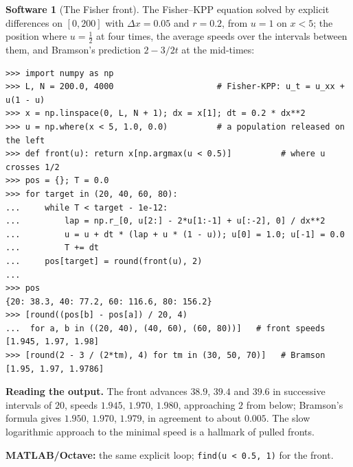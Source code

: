 \documentclass[11pt,a4paper]{article}
\numberwithin{equation}{section}
\theoremstyle{definition}
\newtheorem{software}[thm]{Software}
\begin{document}
\begin{software}[The Fisher front]
\label{sw:fisher}
The Fisher--KPP equation solved by explicit differences on $[0, 200]$ with $\Delta x = 0.05$ and $r = 0.2$, from $u = 1$ on $x < 5$; the position where $u = \frac12$ at four times, the average speeds over the intervals between them, and Bramson's prediction $2 - 3/2t$ at the mid-times:
{\small\begin{verbatim}
>>> import numpy as np
>>> L, N = 200.0, 4000                     # Fisher-KPP: u_t = u_xx + u(1 - u)
>>> x = np.linspace(0, L, N + 1); dx = x[1]; dt = 0.2 * dx**2
>>> u = np.where(x < 5, 1.0, 0.0)          # a population released on the left
>>> def front(u): return x[np.argmax(u < 0.5)]          # where u crosses 1/2
>>> pos = {}; T = 0.0
>>> for target in (20, 40, 60, 80):
...     while T < target - 1e-12:
...         lap = np.r_[0, u[2:] - 2*u[1:-1] + u[:-2], 0] / dx**2
...         u = u + dt * (lap + u * (1 - u)); u[0] = 1.0; u[-1] = 0.0
...         T += dt
...     pos[target] = round(front(u), 2)
...
>>> pos
{20: 38.3, 40: 77.2, 60: 116.6, 80: 156.2}
>>> [round((pos[b] - pos[a]) / 20, 4)
...  for a, b in ((20, 40), (40, 60), (60, 80))]   # front speeds
[1.945, 1.97, 1.98]
>>> [round(2 - 3 / (2*tm), 4) for tm in (30, 50, 70)]   # Bramson
[1.95, 1.97, 1.9786]
\end{verbatim}}
\textbf{Reading the output.} The front advances $38.9$, $39.4$ and $39.6$ in successive intervals of $20$, speeds $1.945$, $1.970$, $1.980$, approaching $2$ from below; Bramson's formula gives $1.950$, $1.970$, $1.979$, in agreement to about $0.005$. The slow logarithmic approach to the minimal speed is a hallmark of
pulled fronts.

\textbf{MATLAB/Octave:} the same explicit loop; \texttt{find(u < 0.5, 1)} for the front.
\end{software}
\end{document}
